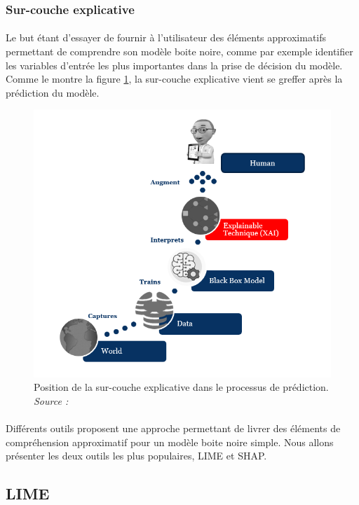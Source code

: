 \subsubsection{Sur-couche explicative}
\paragraph{}Le but étant d'essayer de fournir à l'utilisateur des éléments approximatifs permettant de comprendre son modèle boite noire, comme par exemple identifier les variables d'entrée les plus importantes dans la prise de décision du modèle. Comme le montre la figure \ref{explainCouche}, la sur-couche explicative vient se greffer après la prédiction du modèle.
\begin{figure}[h]
\centering
\includegraphics[scale=0.35]{src_img/explainCouche.png}
\caption{Position de la sur-couche explicative dans le processus de prédiction. \textit{Source : \cite{kdCouche}}}
\label{explainCouche}
\end{figure}
\paragraph{}Différents outils proposent une approche permettant de livrer des éléments de compréhension approximatif pour un modèle boite noire simple. Nous allons présenter les deux outils les plus populaires, LIME et SHAP.
\subsection{LIME}

